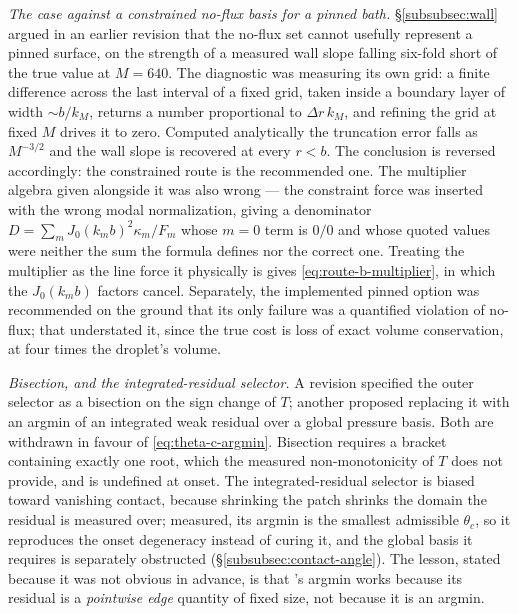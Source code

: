 \emph{The case against a constrained no-flux basis for a pinned bath.} \S\ref{subsubsec:wall} argued in an earlier revision that the no-flux set cannot usefully represent a pinned surface, on the strength of a measured wall slope falling six-fold short of the true value at $M=640$. The diagnostic was measuring its own grid: a finite difference across the last interval of a fixed grid, taken inside a boundary layer of width $\sim b/k_M$, returns a number proportional to $\Delta r\,k_M$, and refining the grid at fixed $M$ drives it to zero. Computed analytically the truncation error falls as $M^{-3/2}$ and the wall slope is recovered at every $r<b$. The conclusion is reversed accordingly: the constrained route is the recommended one. The multiplier algebra given alongside it was also wrong --- the constraint force was inserted with the wrong modal normalization, giving a denominator $D=\sum_mJ_0(k_mb)^2\kappa_m/F_m$ whose $m=0$ term is $0/0$ and whose quoted values were neither the sum the formula defines nor the correct one. Treating the multiplier as the line force it physically is gives \eqref{eq:route-b-multiplier}, in which the $J_0(k_mb)$ factors cancel. Separately, the implemented pinned option was recommended on the ground that its only failure was a quantified violation of no-flux; that understated it, since the true cost is loss of exact volume conservation, at four times the droplet's volume.

\emph{Bisection, and the integrated-residual selector.} A revision specified the outer selector as a bisection on the sign change of $T$; another proposed replacing it with an argmin of an integrated weak residual over a global pressure basis. Both are withdrawn in favour of \eqref{eq:theta-c-argmin}. Bisection requires a bracket containing exactly one root, which the measured non-monotonicity of $T$ does not provide, and is undefined at onset. The integrated-residual selector is biased toward vanishing contact, because shrinking the patch shrinks the domain the residual is measured over; measured, its argmin is the smallest admissible $\theta_c$, so it reproduces the onset degeneracy instead of curing it, and the global basis it requires is separately obstructed (\S\ref{subsubsec:contact-angle}). The lesson, stated because it was not obvious in advance, is that \cite{AgueroEtAl2026}'s argmin works because its residual is a \emph{pointwise edge} quantity of fixed size, not because it is an argmin.
